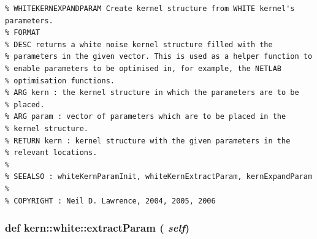 \footnotesize\begin{verbatim}% WHITEKERNEXPANDPARAM Create kernel structure from WHITE kernel's parameters.
% FORMAT
% DESC returns a white noise kernel structure filled with the
% parameters in the given vector. This is used as a helper function to
% enable parameters to be optimised in, for example, the NETLAB
% optimisation functions.
% ARG kern : the kernel structure in which the parameters are to be
% placed.
% ARG param : vector of parameters which are to be placed in the
% kernel structure.
% RETURN kern : kernel structure with the given parameters in the
% relevant locations.
%
% SEEALSO : whiteKernParamInit, whiteKernExtractParam, kernExpandParam
%
% COPYRIGHT : Neil D. Lawrence, 2004, 2005, 2006

\end{verbatim}
\normalsize
 \hypertarget{classkern_1_1white_9b1bed2b896a0f9f15e3d568c2f2c54a}{
\subsubsection[{extractParam}]{\setlength{\rightskip}{0pt plus 5cm}def kern::white::extractParam ( {\em self})}}
\label{classkern_1_1white_9b1bed2b896a0f9f15e3d568c2f2c54a}




